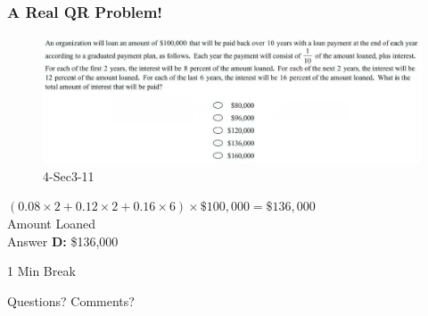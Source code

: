 \documentclass[
	11pt, %
	handout,
]{beamer}
\begin{document}

\begin{frame}
	\frametitle{A Real QR Problem!}
	\framesubtitle{}
	\begin{figure}
		\includegraphics[width=\linewidth]{Interest_Example_Question2.png}
		\caption{4-Sec3-11}
	\end{figure}
	\pause
	$(0.08 \times 2 + 0.12 \times 2 + 0.16 \times 6) \times \$100,000= \$136,000$\\
\alert{Amount Loaned}\\
	\bigskip
	Answer \textbf{D: } \$136,000
\end{frame}



\begin{frame}[plain] %
	\begin{center}
		{\Huge 1 Min Break}
		\bigskip\bigskip %
		
		{\LARGE Questions? Comments?}
	\end{center}
\end{frame}

\end{document}

